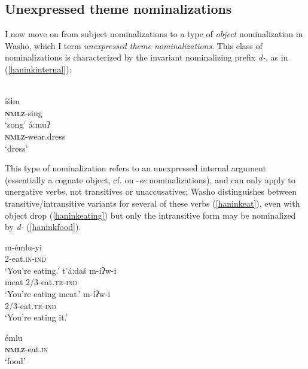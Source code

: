 \documentclass[output=paper]{langscibook}
\begin{document}
\subsection{Unexpressed theme nominalizations}

I now move on from subject nominalizations to a type of {\itshape object} nominalization in Washo, which I term {\itshape unexpressed theme nominalizations}. This class of nominalizations is characterized by the invariant nominalizing prefix {\itshape d-}, as in (\ref{haninkinternal}): 

\label{haninkinternal}\\
\ea {}íšɨm\\
\textbf{\textsc{nmlz}}-sing\\
\glt `song'
\ex {}á:muʔ\\
\textbf{\textsc{nmlz}}-wear.dress\\
\glt `dress' 


\z
\z 


This type of nominalization refers to an unexpressed internal argument (essentially a cognate object, cf. \cite{barker1998} on -{\itshape ee} nominalizations), and can only apply to unergative verbs, not transitives or unaccusatives; Washo distinguishes between transitive/intransitive variants for several of these verbs (\ref{haninkeat}), even with object drop (\ref{haninkeating}) but only the intransitive form may be nominalized by {\itshape d-} (\ref{haninkfood}).


\label{haninkeat}
\ea \gll m-émlu-yi\\
2-eat.{\scshape in}-{\scshape ind}\\
\glt `You're eating.'
\ex \gll t'á:daš m-íʔw-i\\
meat 2/3-eat.{\scshape tr}-{\scshape ind}\\
\glt `You're eating meat.'
\ex \gll  m-íʔw-i\\
2/3-eat.{\scshape tr}-{\scshape ind}\\
\glt `You're eating it.' \hfill \citep[149]{jacobsen1979} \label{haninkeating}
\z
\z

\label{haninkfood}
\ea {}émlu\\
\textbf{\textsc{nmlz}}-eat.{\scshape in}\\
\glt `food'
\z
\z
\end{document}
